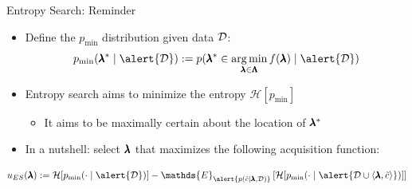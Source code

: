\begin{frame}[c]{Entropy Search: Reminder}

\begin{itemize}
		\item Define the $p_{\text{min}}$ distribution given data $\mathcal{D}$:
		$$p_{\text{min}}(\conf^* \mid \alert{\dataset}) := p(\conf^* \in \argmin_{\conf\in \pcs} \func(\conf) \mid \alert{\dataset})$$
	

		\item Entropy search  aims to minimize the entropy \alert{$\mathcal{H}[p_\text{min}]$} 
		\begin{itemize}
			\item It aims to be maximally certain about the location of $\pmb{\lambda}^*$
		\end{itemize}

\bigskip
\pause
		\item In a nutshell: select 
$\pmb{\lambda}$ that maximizes the following acquisition function:
\end{itemize}
\vspace*{0.5cm}
	\[{\acq}_{ES}(\conf) := \mathcal{H}[p_{\text{min}}(\cdot \mid \alert{\dataset})] - \mathds{E}_{\alert{p(\tilde{\cost}\mid \conf, \dataset)}} 
	\left[   \mathcal{H}[p_{\text{min}}(\cdot \mid \alert{\dataset \cup \left\langle \conf, \tilde{\cost} \right\rangle })] \right]\]

\end{frame}

